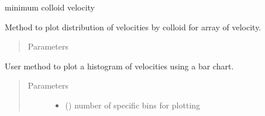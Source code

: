 \documentclass[letterpaper,10pt,english]{sphinxmanual}
\begin{document}
\begin{fulllineitems}
\begin{fulllineitems}
\end{fulllineitems}


\begin{fulllineitems}
\label{\detokenize{index:lb_colloids.Colloids.Colloid_output.ColloidVelocity.min}}
 \textendash{} minimum colloid velocity

\end{fulllineitems}


\begin{fulllineitems}
\label{\detokenize{index:lb_colloids.Colloids.Colloid_output.ColloidVelocity.plot}}
Method to plot distribution of velocities by
colloid for array of velocity.
\begin{quote}\begin{description}
\item[{Parameters}] \leavevmode
{}


\end{description}\end{quote}

\end{fulllineitems}


\begin{fulllineitems}
\label{\detokenize{index:lb_colloids.Colloids.Colloid_output.ColloidVelocity.plot_histogram}}
User method to plot a histogram of velocities using
a bar chart.
\begin{quote}\begin{description}
\item[{Parameters}] \leavevmode\begin{itemize}
\item {} 
 () \textendash{} number of specific bins for plotting


\end{itemize}
\end{description}
\end{quote}
\end{fulllineitems}
\end{fulllineitems}
\end{document}
